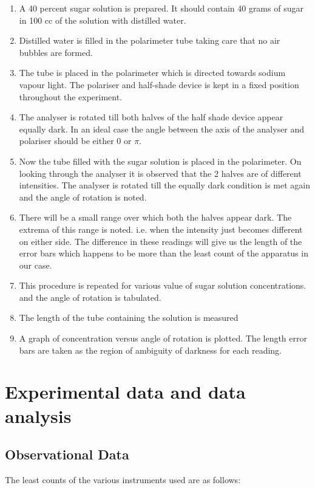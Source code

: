 \documentclass{dkpinto-report}
\begin{document}
\begin{enumerate}
\itemsep0em
\item A 40 percent sugar solution is prepared. It should contain 40 grams of sugar in 100 cc of the solution with distilled water.
\item Distilled water is filled in the polarimeter tube taking care that no air bubbles are formed.
\item The tube is placed in the polarimeter which is directed towards sodium vapour light. The polariser and half-shade device is kept in a fixed position throughout the experiment.
\item The analyser is rotated till both halves of the half shade device appear equally dark. In an ideal case the angle between the axis of the analyser and polariser should be either 0 or $\pi$.
\item Now the tube filled with the sugar solution is placed in the polarimeter. On looking through the analyser it is observed that the 2 halves are of different intensities. The analyser is rotated till the equally dark condition is met again and the angle of rotation is noted.
\item There will be a small range over which both the halves appear dark. The extrema of this range is noted. i.e. when the intensity just becomes different on either side. The difference in these readings will give us the length of the error bars which happens to be more than the least count of the apparatus in our case.
\item This procedure is repeated for various value of sugar solution concentrations. and the angle of rotation is tabulated.
\item The length of the tube containing the solution is measured
\item A graph of concentration versus angle of rotation is plotted. The length error bars are taken as the region of ambiguity of darkness for each reading.
\end{enumerate}


\section{Experimental data and data analysis}

\subsection{Observational Data}
The least counts of the various instruments used are as follows:
\end{document}
